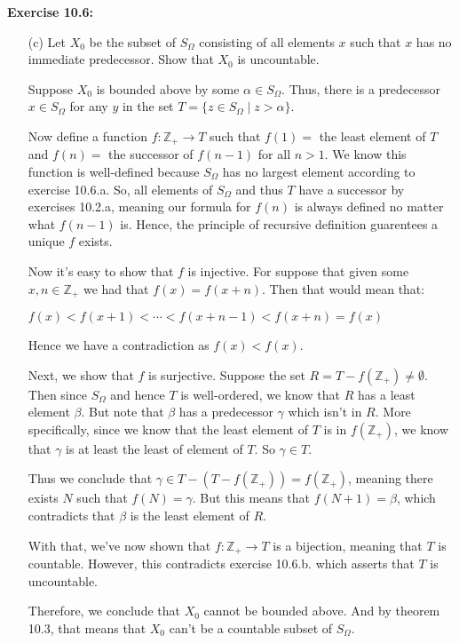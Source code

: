 \documentclass{book}
\newcommand{\exTwo}{%
\color{Purple}%
   \fontsize{13}{15}\selectfont%
}
\newenvironment{myIndent}{%
   \begin{adjustwidth}{2.5em}{0em}%
}{%
   \end{adjustwidth}%
}
\newcommand{\blab}[1]{\textbf{#1}}
\newcommand{\retTwo}{\hfill\bigbreak}
\begin{document}
   \blab{Exercise 10.6:}
   \begin{itemize}
      \item[(c)] Let $X_0$ be the subset of $S_\Omega$ consisting of all elements $x$ such that $x$ has no\\ immediate predecessor. Show that $X_0$ is uncountable.
      
      \begin{myIndent}\exTwo
         Suppose $X_0$ is bounded above by some $\alpha \in S_\Omega$. Thus, there is a predecessor $x \in S_\Omega$ for any $y$ in the set $T = \{z \in S_\Omega \mid z > \alpha\}$.\newpage

         Now define a function $f: \mathbb{Z}_+ \longrightarrow T$ such that $f(1) =$ the least element of $T$ and $f(n) =$ the successor of $f(n - 1)$ for all $n > 1$. We know this function is well-defined because $S_\Omega$ has no largest element according to exercise 10.6.a. So, all elements of $S_\Omega$ and thus $T$ have a successor by exercises 10.2.a, meaning our formula for $f(n)$ is always defined no matter what $f(n-1)$ is. Hence, the principle of recursive definition guarentees a unique $f$ exists.\retTwo

         Now it's easy to show that $f$ is injective. For suppose that given some $x, n \in \mathbb{Z}_+$ we had that $f(x) = f(x + n)$. Then that would mean that:

         {\centering $f(x) < f(x + 1) < \cdots < f(x + n - 1) < f(x + n) = f(x) $\retTwo\par}

         Hence we have a contradiction as $f(x) < f(x)$.\retTwo

         Next, we show that $f$ is surjective. Suppose the set $R = T - f(\mathbb{Z}_+) \neq \emptyset$. Then since $S_\Omega$ and hence $T$ is well-ordered, we know that $R$ has a least element $\beta$. But note that $\beta$ has a predecessor $\gamma$ which isn't in $R$. More specifically, since we know that the least element of $T$ is in $f(\mathbb{Z}_+)$, we know that $\gamma$ is at least the least of element of $T$. So $\gamma \in T$.\retTwo

         Thus we conclude that $\gamma \in T - (T - f(\mathbb{Z}_+)) = f(\mathbb{Z}_+)$, meaning there exists $N$ such that $f(N) = \gamma$. But this means that $f(N + 1) = \beta$, which contradicts that $\beta$ is the least element of $R$.\retTwo

         With that, we've now shown that $f: \mathbb{Z}_+ \longrightarrow T$ is a bijection, meaning that $T$ is countable. However, this contradicts exercise 10.6.b. which asserts that $T$ is uncountable.\retTwo

         Therefore, we conclude that $X_0$ cannot be bounded above. And by theorem 10.3, that means that $X_0$ can't be a countable subset of $S_\Omega$.\retTwo
      \end{myIndent}
   \end{itemize}
   
\end{document}
